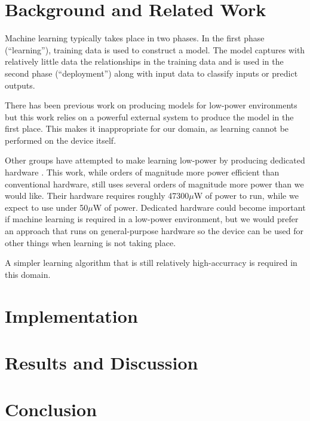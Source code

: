 \documentclass[12pt]{article}
\begin{document}
\section{Background and Related Work}

Machine learning typically takes place in two phases. In the first phase
(``learning''), training data is used to construct a model. The model captures
with relatively little data the relationships in the training data and is used
in the second phase (``deployment'') along with input data to classify inputs
or predict outputs.

There has been previous work on producing models for low-power environments
\cite{low-power-models} but this work relies on a powerful external system to
produce the model in the first place. This makes it inappropriate for our
domain, as learning cannot be performed on the device itself.

Other groups have attempted to make learning low-power by producing dedicated
hardware \cite{ml-on-a-chip}. This work, while orders of magnitude more
power efficient than conventional hardware, still uses several
orders of magnitude more power than we would like. Their hardware requires
roughly 47300{$\mu$}W of power to run, while we expect to use under 50{$\mu$}W of
power. Dedicated hardware could become important if machine learning is
required in a low-power environment, but we would prefer an approach that runs
on general-purpose hardware so the device can be used for other things when
learning is not taking place.

A simpler learning algorithm that is still relatively high-accurracy is
required in this domain.

\section{Implementation}

\section{Results and Discussion}

\section{Conclusion}



\end{document}
